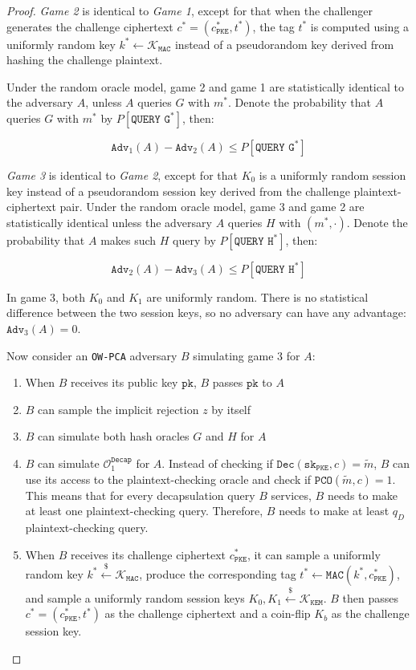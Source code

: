 \documentclass[floatrow,journal=tches,submission]{iacrtrans}
\newcommand{\pke}{\texttt{PKE}}
\newcommand{\decrypt}{\texttt{Dec}}
\newcommand{\kem}{\texttt{KEM}}
\newcommand{\decap}{\texttt{Decap}}
\newcommand{\mac}{\texttt{MAC}}
\newcommand{\pk}{\texttt{pk}}
\newcommand{\sk}{\texttt{sk}}
\newcommand{\pco}{\texttt{PCO}}
\newcommand{\leftsample}{\stackrel{\$}{\leftarrow}}
\begin{document}
\begin{proof}
    \emph{Game 2} is identical to \emph{Game 1}, except for that when the challenger generates the challenge ciphertext $c^\ast = (c^\ast_\pke, t^\ast)$, the tag $t^\ast$ is computed using a uniformly random key $k^\ast \leftarrow \mathcal{K}_\mac$ instead of a pseudorandom key derived from hashing the challenge plaintext.

    Under the random oracle model, game 2 and game 1 are statistically identical to the adversary $A$, unless $A$ queries $G$ with $m^\ast$. Denote the probability that $A$ queries $G$ with $m^\ast$ by $P[\texttt{QUERY G}^\ast]$, then:

    \begin{equation*}
        \texttt{Adv}_1(A) - \texttt{Adv}_2(A) \leq P[\texttt{QUERY G}^\ast]
    \end{equation*}

    \emph{Game 3} is identical to \emph{Game 2}, except for that $K_0$ is a uniformly random session key instead of a pseudorandom session key derived from the challenge plaintext-ciphertext pair. Under the random oracle model, game 3 and game 2 are statistically identical unless the adversary $A$ queries $H$ with $(m^\ast, \cdot)$. Denote the probability that $A$ makes such $H$ query by $P[\texttt{QUERY H}^\ast]$, then:

    \begin{equation*}
        \texttt{Adv}_2(A) - \texttt{Adv}_3(A) \leq P[\texttt{QUERY H}^\ast]
    \end{equation*}

    In game 3, both $K_0$ and $K_1$ are uniformly random. There is no statistical difference between the two session keys, so no adversary can have any advantage: $\texttt{Adv}_3(A) = 0$.

    Now consider an \texttt{OW-PCA} adversary $B$ simulating game 3 for $A$: \begin{enumerate}
        \item When $B$ receives its public key $\pk$, $B$ passes $\pk$ to $A$
        \item $B$ can sample the implicit rejection $z$ by itself
        \item $B$ can simulate both hash oracles $G$ and $H$ for $A$
        \item $B$ can simulate $\mathcal{O}^\decap_1$ for $A$. Instead of checking if $\decrypt(\sk_\pke, c) = \tilde{m}$, $B$ can use its access to the plaintext-checking oracle and check if $\pco(\tilde{m}, c) = 1$. This means that for every decapsulation query $B$ services, $B$ needs to make at least one plaintext-checking query. Therefore, $B$ needs to make at least $q_D$ plaintext-checking query.
        \item When $B$ receives its challenge ciphertext $c_\pke^\ast$, it can sample a uniformly random key $k^\ast \leftsample \mathcal{K}_\mac$, produce the corresponding tag $t^\ast \leftarrow \mac(k^\ast, c^\ast_\pke)$, and sample a uniformly random session keys $K_0, K_1 \leftsample \mathcal{K}_\kem$. $B$ then passes $c^\ast = (c^\ast_\pke, t^\ast)$ as the challenge ciphertext and a coin-flip $K_b$ as the challenge session key.
    \end{enumerate}


\end{proof}
\end{document}

